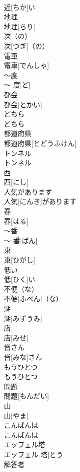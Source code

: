 \documentclass[8pt]{extreport}
\begin{document}
\begin{CJK}{UTF8}{min}
\\	近[ちか]い		
\\	地理	
\\	地理[ちり]		
\\	次（の）	
\\	次[つぎ]（の）		
\\	電車	
\\	電車[でんしゃ]		
\\	〜度	
\\	〜 度[ど]		
\\	都会	
\\	都会[とかい]		
\\	どちら	
\\	どちら		
\\	都道府県	
\\	都道府県[とどうふけん]		
\\	トンネル	
\\	トンネル		
\\	西	
\\	西[にし]		
\\	人気があります	
\\	人気[にんき]があります		
\\	春	
\\	春[はる]		
\\	〜番	
\\	〜 番[ばん]		
\\	東	
\\	東[ひがし]		
\\	低い	
\\	低[ひく]い		
\\	不便（な）	
\\	不便[ふべん]（な）		
\\	湖	
\\	湖[みずうみ]		
\\	店	
\\	店[みせ]		
\\	皆さん	
\\	皆[みな]さん		
\\	もうひとつ	
\\	もうひとつ		
\\	問題	
\\	問題[もんだい]		
\\	山	
\\	山[やま]		
\\	こんばんは	
\\	こんばんは		
\\	エッフェル塔	
\\	エッフェル 塔[とう]		
\\	解答者	

\end{CJK}
\end{document}

